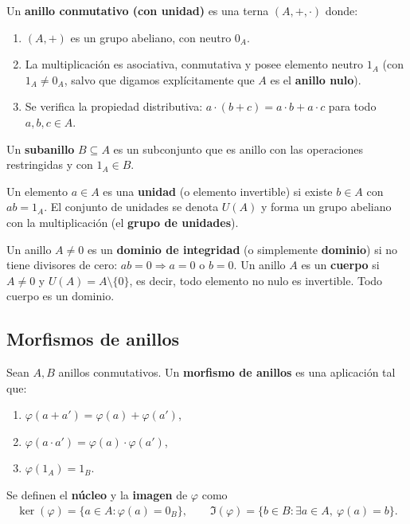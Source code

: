 \begin{definicion}\label{def:anillo}
Un \textbf{anillo conmutativo (con unidad)} es una terna $(A,+,\cdot)$ donde:
\begin{enumerate}
    \item $(A,+)$ es un grupo abeliano, con neutro $0_A$.
    \item La multiplicación
    es asociativa, conmutativa y posee elemento neutro $1_A$ (con $1_A\neq 0_A$, salvo que digamos explícitamente que $A$ es el \textbf{anillo nulo}).
    \item Se verifica la propiedad distributiva: $a\cdot(b+c) = a\cdot b + a\cdot c$ para todo $a,b,c\in A$.
\end{enumerate}
\end{definicion}

Un \textbf{subanillo} $B\subseteq A$ es un subconjunto que es anillo con las operaciones restringidas y con $1_A\in B$.

\begin{definicion}
Un elemento $a\in A$ es una \textbf{unidad} (o elemento invertible) si existe $b\in A$ con $ab=1_A$. El conjunto de unidades se denota $U(A)$ y forma un grupo abeliano con la multiplicación (el \textbf{grupo de unidades}).
\end{definicion}

Un anillo $A\neq 0$ es un \textbf{dominio de integridad} (o simplemente \textbf{dominio}) si no tiene divisores de cero: $ab=0 \Rightarrow a=0$ o $b=0$. Un anillo $A$ es un \textbf{cuerpo} si $A\neq 0$ y $U(A)=A\setminus\{0\}$, es decir, todo elemento no nulo es invertible. Todo cuerpo es un dominio.

\subsection{Morfismos de anillos}

\begin{definicion}
Sean $A,B$ anillos conmutativos. Un \textbf{morfismo de anillos} es una aplicación
tal que:
\begin{enumerate}
    \item $\varphi(a+a') = \varphi(a)+\varphi(a')$,
    \item $\varphi(a\cdot a') = \varphi(a)\cdot \varphi(a')$,
    \item $\varphi(1_A) = 1_B$.
\end{enumerate}
Se definen el \textbf{núcleo} y la \textbf{imagen} de $\varphi$ como
\begin{gather*}
    \ker(\varphi) = \{a\in A : \varphi(a)=0_B\}, \qquad
    \Im(\varphi) = \{b\in B : \exists a\in A,\ \varphi(a)=b\}.
\end{gather*}
\end{definicion}

